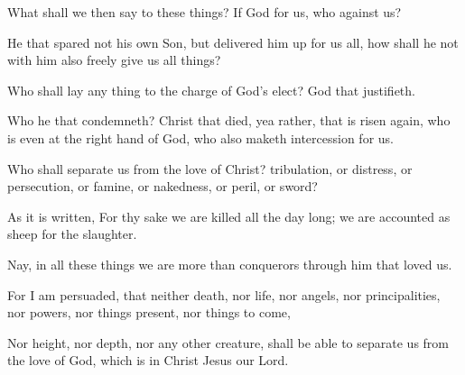 {What shall
we
then
say
to these
things?
If
God
{}
for
us,
who
{}
against
us?

He
that
spared
not his
own
Son,
but
delivered
him
up
for
us
all,
how shall
he
not
with
him
also freely
give
us all
things?

Who shall lay any thing to the
charge
of
God’s
elect?
{}
God that
justifieth.

Who
{} he that
condemneth?
{}
Christ that
died,
yea
rather, that is
risen
again,
who
is
even
at the right
hand of
God,
who
also maketh
intercession
for
us.

Who shall
separate
us
from the
love of
Christ?
{}
tribulation,
or
distress,
or
persecution,
or
famine,
or
nakedness,
or
peril,
or
sword?

As it is
written,
For
thy
sake we are
killed
all the day
long; we are
accounted
as
sheep for the
slaughter.

Nay,
in
all these
things we are more than
conquerors
through him that
loved
us.

For I am
persuaded,
that
neither
death,
nor
life,
nor
angels,
nor
principalities,
nor
powers,
nor things
present,
nor things to
come,

Nor
height,
nor
depth,
nor
any
other
creature, shall be
able to
separate
us
from the
love of
God, which
is
in
Christ
Jesus
our
Lord.




\par }
